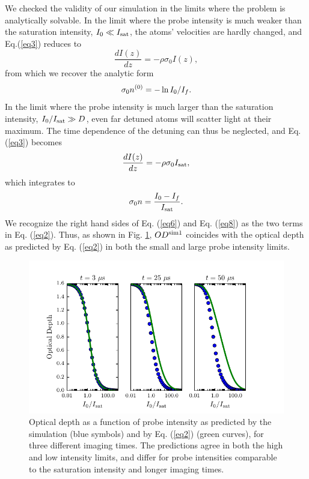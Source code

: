 \documentclass[12pt]{iopart}
\begin{document}
\par We checked the validity of our simulation in the limits where the problem is analytically solvable. In the limit where the probe intensity is much weaker than the saturation intensity, $I_0\ll I_{\rm{sat}}$, the atoms' velocities are hardly changed, and Eq.(\ref{eq3}) reduces to
\begin{equation}
\frac{dI(z)}{dz}=-\rho\sigma_0 I(z),
\end{equation}
from which we recover the analytic form
\begin{equation}
\sigma_0 n^{\rm{(0)}} = -\ln I_0/I_f. \label{eq6}
\end{equation}
In the limit where the probe intensity is much larger than the saturation intensity, $I_0/I_{\rm{sat}}\gg D$, even far detuned atoms will scatter light at their maximum. The time dependence of the detuning can thus be neglected, and Eq. (\ref{eq3}) becomes
\begin{equation}
\frac{dI(z)}{dz}=-\rho\sigma_0 I_{\rm{sat}},
\end{equation}
which integrates to
\begin{equation}
\sigma_0 n = \frac{I_0 - I_f}{I_{\rm{sat}}}. \label{eq8}
\end{equation}
We recognize the right hand sides of Eq. (\ref{eq6}) and Eq. (\ref{eq8}) as the two terms in Eq. (\ref{eq2}). Thus, as shown in  Fig. \ref{fig:IsatLimits}, $OD^{\rm{sim1}}$  coincides with the optical depth as predicted by Eq. (\ref{eq2}) in both the small and large probe intensity limits.
\begin{figure}
	\includegraphics{figure3.pdf}
\caption{Optical depth as a function of probe intensity as predicted by the simulation (blue symbols) and by Eq. (\ref{eq2}) (green curves), for three different imaging times. The predictions agree in both the high and low intensity limits, and differ for probe intensities comparable to the saturation intensity and longer imaging times. }
\label{fig:IsatLimits}
\end{figure}
\end{document}
